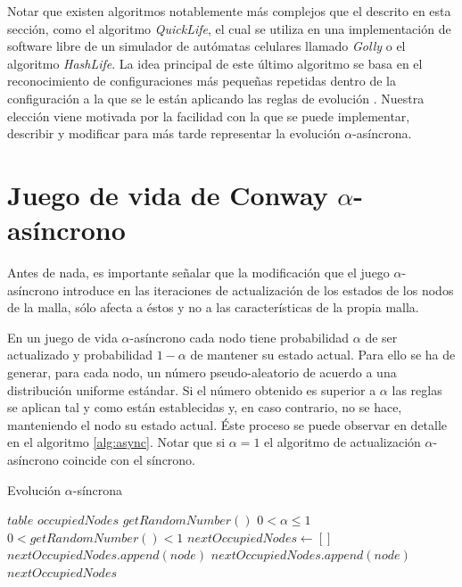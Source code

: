 \documentclass[../proyecto.tex]{memoir}
\begin{document}
Notar que existen algoritmos notablemente más complejos que el descrito en esta sección, como el algoritmo \textit{QuickLife}, el cual se utiliza en una implementación de software libre de un simulador de autómatas celulares llamado \textit{Golly} \cite{quicklife} o el algoritmo \textit{HashLife}. La idea principal de este último algoritmo se basa en el reconocimiento de configuraciones más pequeñas repetidas dentro de la configuración a la que se le están aplicando las reglas de evolución \cite{hashlife}. Nuestra elección viene motivada por la facilidad con la que se puede implementar, describir y modificar para más tarde representar la evolución $\alpha$-asíncrona.

\section{Juego de vida de Conway $\alpha$-asíncrono}

Antes de nada, es importante señalar que la modificación que el juego $\alpha$-asíncrono introduce en las iteraciones de actualización de los estados de los nodos de la malla, sólo afecta a éstos y no a las características de la propia malla.

En un juego de vida $\alpha$-asíncrono cada nodo tiene probabilidad $\alpha$ de ser actualizado y probabilidad $1-\alpha$ de mantener su estado actual. Para ello se ha de generar, para cada nodo, un número pseudo-aleatorio de acuerdo a una distribución uniforme estándar. Si el número obtenido es superior a $\alpha$ las reglas se aplican tal y como están establecidas y, en caso contrario, no se hace, manteniendo el nodo su estado actual. Éste proceso se puede observar en detalle en el algoritmo \ref{alg:async}. Notar que si $\alpha=1$ el algoritmo de actualización $\alpha$-asíncrono coincide con el síncrono.

\begin{algorithm}[H]
\caption{Evolución $\alpha$-síncrona}
\label{alg:async}
\begin{algorithmic}
\REQUIRE $table$
\REQUIRE $occupiedNodes$
\REQUIRE $getRandomNumber()$
\ENSURE  $0 < \alpha \leq 1$
\ENSURE $0< getRandomNumber() < 1$
\STATE $nextOccupiedNodes \leftarrow []$
\STATE $nextOccupiedNodes.append(node)$
\STATE $nextOccupiedNodes.append(node)$
\ENDIF
\ENDIF
\ENDFOR
\RETURN $nextOccupiedNodes$
\end{algorithmic}
\end{algorithm}
\end{document}
